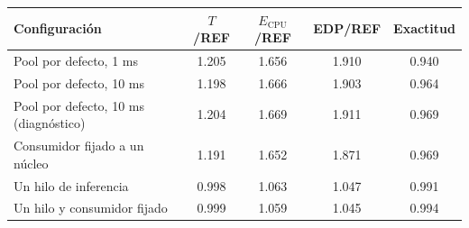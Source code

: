 \begin{tabular}{@{}lcccc@{}}
\toprule
\textbf{Configuración} & \textbf{$T$/REF} & \textbf{$E_{\mathrm{CPU}}$/REF} & \textbf{EDP/REF} & \textbf{Exactitud} \\
\midrule
Pool por defecto, 1 ms & 1.205 & 1.656 & 1.910 & 0.940 \\
Pool por defecto, 10 ms & 1.198 & 1.666 & 1.903 & 0.964 \\
Pool por defecto, 10 ms (diagnóstico) & 1.204 & 1.669 & 1.911 & 0.969 \\
Consumidor fijado a un núcleo & 1.191 & 1.652 & 1.871 & 0.969 \\
Un hilo de inferencia & 0.998 & 1.063 & 1.047 & 0.991 \\
Un hilo y consumidor fijado & 0.999 & 1.059 & 1.045 & 0.994 \\
\bottomrule
\end{tabular}
